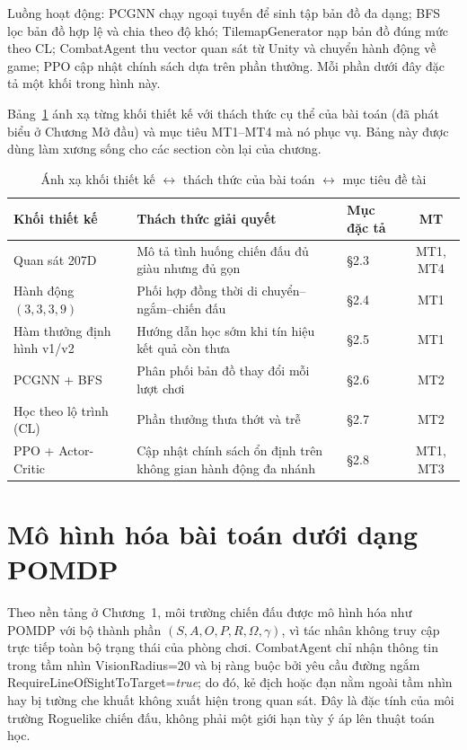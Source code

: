 Luồng hoạt động: PCGNN chạy ngoại tuyến để sinh tập bản đồ đa dạng; BFS lọc bản đồ hợp lệ và chia theo độ khó; TilemapGenerator nạp bản đồ đúng mức theo CL; CombatAgent thu vector quan sát từ Unity và chuyển hành động về game; PPO cập nhật chính sách dựa trên phần thưởng. Mỗi phần dưới đây đặc tả một khối trong hình này.

Bảng~\ref{tab:design_block_mapping} ánh xạ từng khối thiết kế với thách thức cụ thể của bài toán (đã phát biểu ở Chương Mở đầu) và mục tiêu MT1--MT4 mà nó phục vụ. Bảng này được dùng làm xương sống cho các section còn lại của chương.

\begin{table}[H]
    \centering
    \small
    \caption{Ánh xạ khối thiết kế $\leftrightarrow$ thách thức của bài toán $\leftrightarrow$ mục tiêu đề tài}
    \label{tab:design_block_mapping}
    \begin{tabular}{|p{3.4cm}|p{4.5cm}|p{3.5cm}|c|}
        \hline
        \textbf{Khối thiết kế} & \textbf{Thách thức giải quyết} & \textbf{Mục đặc tả} & \textbf{MT} \\
        \hline
        Quan sát 207D & Mô tả tình huống chiến đấu đủ giàu nhưng đủ gọn & §2.3 & MT1, MT4 \\
        \hline
        Hành động $(3,3,3,9)$ & Phối hợp đồng thời di chuyển--ngắm--chiến đấu & §2.4 & MT1 \\
        \hline
        Hàm thưởng định hình v1/v2 & Hướng dẫn học sớm khi tín hiệu kết quả còn thưa & §2.5 & MT1 \\
        \hline
        PCGNN + BFS & Phân phối bản đồ thay đổi mỗi lượt chơi & §2.6 & MT2 \\
        \hline
        Học theo lộ trình (CL) & Phần thưởng thưa thớt và trễ & §2.7 & MT2 \\
        \hline
        PPO + Actor-Critic & Cập nhật chính sách ổn định trên không gian hành động đa nhánh & §2.8 & MT1, MT3 \\
        \hline
    \end{tabular}
\end{table}

\section{Mô hình hóa bài toán dưới dạng POMDP}

Theo nền tảng ở Chương~1, môi trường chiến đấu được mô hình hóa như POMDP với bộ thành phần $(S, A, O, P, R, \Omega, \gamma)$, vì tác nhân không truy cập trực tiếp toàn bộ trạng thái của phòng chơi. CombatAgent chỉ nhận thông tin trong tầm nhìn VisionRadius=20 và bị ràng buộc bởi yêu cầu đường ngắm RequireLineOfSightToTarget=\textit{true}; do đó, kẻ địch hoặc đạn nằm ngoài tầm nhìn hay bị tường che khuất không xuất hiện trong quan sát. Đây là đặc tính của môi trường Roguelike chiến đấu, không phải một giới hạn tùy ý áp lên thuật toán học.


